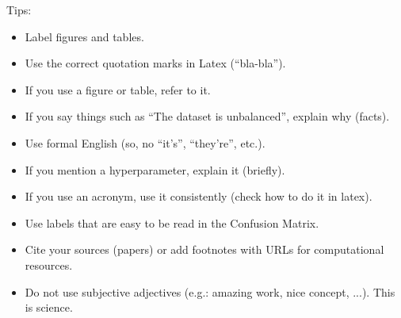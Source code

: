 \documentclass[twocolumn,10pt]{article}
\begin{document}
Tips:
\begin{itemize}
\item Label figures and tables.
\item Use the correct quotation marks in Latex (``bla-bla'').
\item If you use a figure or table, refer to it.
\item If you say things such as ``The dataset is unbalanced'', explain why (facts).
\item Use formal English (so, no ``it's'', ``they're'', etc.).
\item If you mention a hyperparameter, explain it (briefly).
\item If you use an acronym, use it consistently (check how to do it in latex).
\item Use labels that are easy to be read in the Confusion Matrix.
\item Cite your sources (papers) or add footnotes with URLs for computational resources.
\item Do not use subjective adjectives (e.g.: amazing work, nice concept, ...). This is science.
\end{itemize}
 
\end{document}
